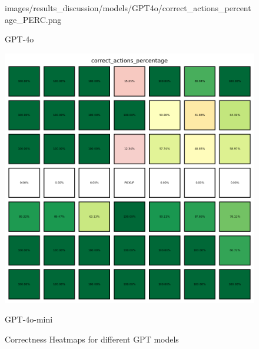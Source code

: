 \begin{figure}[ht]
\begin{minipage}[b]{0.32\textwidth}
{      images/results_discussion/models/GPT4o/correct_actions_percentage_PERC.png
    }
    \caption{GPT-4o}
    \label{fig:models_gpt4o}
  \end{minipage}
  \hfill
  \begin{minipage}[b]{0.32\textwidth}
    \centering
    \includegraphics[width=\textwidth]{
      images/results_discussion/models/GPT4o-mini/correct_actions_percentage_PERC.png
    }
    \caption{GPT-4o-mini}
    \label{fig:models_gpt4o_mini}
  \end{minipage}
  \caption{Correctness Heatmaps for different GPT models}
  \label{fig:models_chm}
\end{figure}